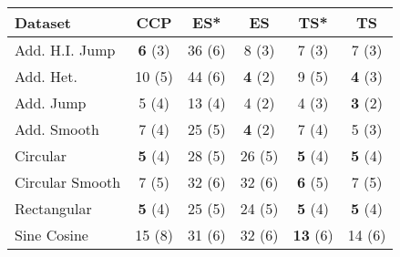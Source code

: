 \begin{tabular}{lccccc}
\toprule
Dataset & CCP & ES* & ES & TS* & TS \\
\midrule
Add. H.I. Jump & \textbf{6} (3) & 36 (6) & 8 (3) & 7 (3) & 7 (3) \\
Add. Het. & 10 (5) & 44 (6) & \textbf{4} (2) & 9 (5) & \textbf{4} (3) \\
Add. Jump & 5 (4) & 13 (4) & 4 (2) & 4 (3) & \textbf{3} (2) \\
Add. Smooth & 7 (4) & 25 (5) & \textbf{4} (2) & 7 (4) & 5 (3) \\
Circular & \textbf{5} (4) & 28 (5) & 26 (5) & \textbf{5} (4) & \textbf{5} (4) \\
Circular Smooth & 7 (5) & 32 (6) & 32 (6) & \textbf{6} (5) & 7 (5) \\
Rectangular & \textbf{5} (4) & 25 (5) & 24 (5) & \textbf{5} (4) & \textbf{5} (4) \\
Sine Cosine & 15 (8) & 31 (6) & 32 (6) & \textbf{13} (6) & 14 (6) \\
\bottomrule
\end{tabular}